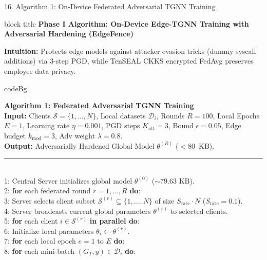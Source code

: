 \documentclass[aspectratio=169,10pt]{beamer}
\begin{document}
\begin{frame}{16. Algorithm 1: On-Device Federated Adversarial TGNN Training}
\vspace{-0.30em}
\begin{beamercolorbox}[rounded=true,shadow=false,sep=0.25em,wd=\textwidth]{block title}
\textbf{\scriptsize Phase I Algorithm: On-Device Edge-TGNN Training with Adversarial Hardening (EdgeFence)}
\end{beamercolorbox}
\vspace{0.08em}
{\fontsize{6.0pt}{7.5pt}\selectfont
\textbf{Intuition:} Protects edge models against attacker evasion tricks (dummy syscall additions) via 3-step PGD, while TenSEAL CKKS encrypted FedAvg preserves employee data privacy.
}
\vspace{0.10em}
\centering
\begin{beamercolorbox}[rounded=true,shadow=false,sep=0.20em,wd=0.98\textwidth]{codeBg}
{\fontsize{4.8pt}{5.8pt}\selectfont\ttfamily
\textbf{Algorithm 1: Federated Adversarial TGNN Training}\\
\textbf{Input:} Clients $\mathcal{S}=\{1,\dots,N\}$, Local datasets $\mathcal{D}_i$, Rounds $R=100$, Local Epochs $E=1$, Learning rate $\eta=0.001$, PGD steps $K_{\text{att}}=3$, Bound $\epsilon=0.05$, Edge budget $k_{\text{mod}}=3$, Adv weight $\lambda=0.8$.\\
\textbf{Output:} Adversarially Hardened Global Model $\theta^{(R)}$ ($<80$~KB).\\[0.03cm]
\rule{\linewidth}{0.3pt}\\[0.03cm]
1: Central Server initializes global model $\theta^{(0)}$ ($\sim 79.63\text{ KB}$).\\
2: \textbf{for} each federated round $r = 1, \dots, R$ \textbf{do}:\\
3: \quad Server selects client subset $\mathcal{S}^{(r)} \subseteq \{1,\dots,N\}$ of size $S_{\text{rate}} \cdot N$ ($S_{\text{rate}}=0.1$).\\
4: \quad Server broadcasts current global parameters $\theta^{(r)}$ to selected clients.\\
5: \quad \textbf{for} each client $i \in \mathcal{S}^{(r)}$ \textbf{in parallel do}:\\
6: \qquad Initialize local parameters $\theta_i \leftarrow \theta^{(r)}$.\\
7: \qquad \textbf{for} each local epoch $e = 1$ to $E$ \textbf{do}:\\
8: \qquad \quad \textbf{for} each mini-batch $(G_T, y) \in \mathcal{D}_i$ \textbf{do}:\\
}
\end{beamercolorbox}
\end{frame}
\end{document}
